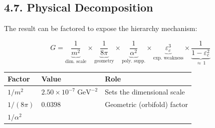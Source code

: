\documentclass[
  11pt,
]{article}
\begin{document}
\hypertarget{physical-decomposition}{%
\subsection{4.7. Physical Decomposition}\label{physical-decomposition}}

The result can be factored to expose the hierarchy mechanism:

\[G = \underbrace{\frac{1}{m^2}}_{\text{dim. scale}} \times \underbrace{\frac{1}{8\pi}}_{\text{geometry}} \times \underbrace{\frac{1}{\alpha^2}}_{\text{poly. supp.}} \times \underbrace{\varepsilon_c^3}_{\text{exp. weakness}} \times \underbrace{\frac{1}{1 - \varepsilon_c^2}}_{\approx\,1} \tag{195}\]

\begin{longtable}[]{@{}lll@{}}
\toprule
\begin{minipage}[b]{0.35\columnwidth}\raggedright
Factor\strut
\end{minipage} & \begin{minipage}[b]{0.30\columnwidth}\raggedright
Value\strut
\end{minipage} & \begin{minipage}[b]{0.26\columnwidth}\raggedright
Role\strut
\end{minipage}\tabularnewline
\midrule
\endhead
\begin{minipage}[t]{0.35\columnwidth}\raggedright
\(1/m^2\)\strut
\end{minipage} & \begin{minipage}[t]{0.30\columnwidth}\raggedright
\(2.50 \times 10^{-7}\;\text{GeV}^{-2}\)\strut
\end{minipage} & \begin{minipage}[t]{0.26\columnwidth}\raggedright
Sets the dimensional scale\strut
\end{minipage}\tabularnewline
\begin{minipage}[t]{0.35\columnwidth}\raggedright
\(1/(8\pi)\)\strut
\end{minipage} & \begin{minipage}[t]{0.30\columnwidth}\raggedright
\(0.0398\)\strut
\end{minipage} & \begin{minipage}[t]{0.26\columnwidth}\raggedright
Geometric (orbifold) factor\strut
\end{minipage}\tabularnewline
\begin{minipage}[t]{0.35\columnwidth}\raggedright
\(1/\alpha^2\)\strut
\end{minipage} & \begin{minipage}[t]{0.30\columnwidth}\raggedright

\end{minipage}
\end{longtable}
\end{document}
